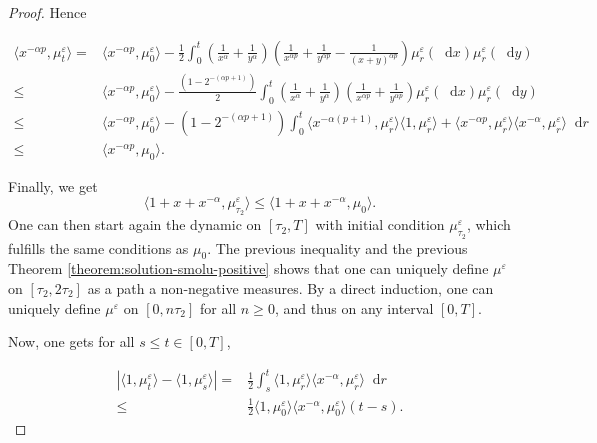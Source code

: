 \documentclass[a4paper,11pt, reqno]{amsart}
\newcommand{\eps}{\varepsilon}
\newcommand{\dd}{\mathop{}\!\mathrm{d}}
\newcommand{\1}{\mathbbm{1}}
\theoremstyle{plain}
\theoremstyle{definition}
\begin{document}
\begin{proof}
  Hence
  
  \begin{align*}
    \langle x^{- \alpha p}, \mu^{\eps}_t \rangle = & \langle x^{-
    \alpha p}, \mu^{\eps}_0 \rangle - \frac{1}{2} \int_0^t \left(
    \frac{1}{x^{\alpha}} + \frac{1}{y^{\alpha}} \right) \left(
    \frac{1}{x^{\alpha p}} + \frac{1}{y^{\alpha p}} - \frac{1}{(x + y)^{\alpha
    p}} \right) \mu^{\eps}_r (\dd x) \mu^{\eps}_r (\dd
    y)\\
    \le & \langle x^{- \alpha p}, \mu^{\eps}_0 \rangle - \frac{(1
    - 2^{- (\alpha p + 1)})}{2} \int_0^t \left( \frac{1}{x^{\alpha}} +
    \frac{1}{y^{\alpha}} \right) \left( \frac{1}{x^{\alpha p}} +
    \frac{1}{y^{\alpha p}} \right) \mu^{\eps}_r (\dd x)
    \mu^{\eps}_r (\dd y)\\
    \le & \langle x^{- \alpha p}, \mu^{\eps}_0 \rangle - (1 -
    2^{- (\alpha p + 1)}) \int_0^t \langle x^{- \alpha (p + 1)},
    \mu_r^{\eps} \rangle \langle 1, \mu_r^{\eps} \rangle +
    \langle x^{- \alpha p}, \mu_r^{\eps} \rangle \langle x^{- \alpha},
    \mu_r^{\eps} \rangle \dd r\\
    \le & \langle x^{- \alpha p}, \mu_0 \rangle .
  \end{align*}
  
  Finally, we get
  \[ \langle 1 + x + x^{- \alpha}, \mu^{\eps}_{\tau_2} \rangle
     \le \langle 1 + x + x^{- \alpha}, \mu_0 \rangle . \]
  One can then start again the dynamic on $[\tau_2, T]$ with initial condition
  $\mu^{\eps}_{\tau_2}$, which fulfills the same conditions as $\mu_0$.
  The previous inequality and the previous Theorem
  \ref{theorem:solution-smolu-positive} shows that one can uniquely define
  $\mu^{\eps}$ on $[\tau_2, 2 \tau_2]$ as a path a non-negative
  measures. By a direct induction, one can uniquely define $\mu^{\eps}$
  on $[0, n \tau_2]$ for all $n \ge 0$, and thus on any interval $[0,
  T]$.
  
  Now, one gets for all $s \le t \in [0, T]$,
  
  \begin{align*}
    | \langle 1, \mu^{\eps}_t \rangle - \langle 1, \mu^{\eps}_s
    \rangle | = & \frac{1}{2} \int_s^t \langle 1, \mu_r^{\eps} \rangle
    \langle x^{- \alpha}, \mu_r^{\eps} \rangle \dd r\\
    \le & \frac{1}{2} \langle 1, \mu_0^{\eps} \rangle \langle
    x^{- \alpha}, \mu_0^{\eps} \rangle (t - s) .
  \end{align*}
  

\end{proof}
\end{document}
